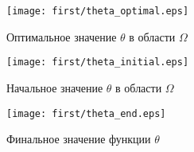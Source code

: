 \documentclass[12pt,a4paper]{article}%
\begin{document}
\begin{figure}
  \texttt{[image: first/theta\_optimal.eps]}
  \caption{Оптимальное значение $\theta$ в области $\Omega$}
  \label{fig1:cost}
\end{figure}

\begin{figure}
  \texttt{[image: first/theta\_initial.eps]}
  \caption{Начальное значение $\theta$ в области $\Omega$}
  \label{fig1:cost}
\end{figure}

\begin{figure}
  \texttt{[image: first/theta\_end.eps]}
  \caption{Финальное значение функции $\theta$}
  \label{fig1:cost}
\end{figure}


\newpage



\end{document}
